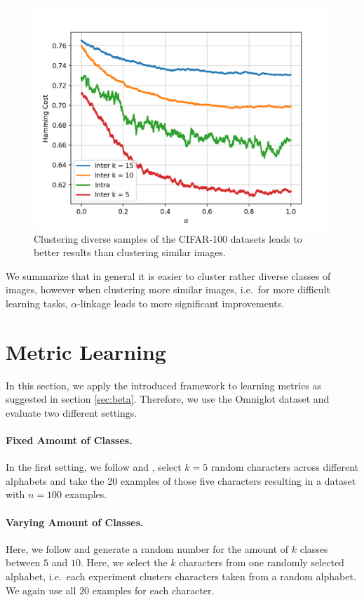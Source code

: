 \begin{figure}[H]
  \centering
  \includegraphics[width=.6\textwidth]{plots/cifar100}
  \caption{Clustering diverse samples of the CIFAR-100 datasets leads to better results than clustering similar images.}
  \label{fig:cifar100}
\end{figure}

We summarize that in general it is easier to cluster rather diverse classes of images, however when clustering more similar images, i.e.\ for more difficult learning tasks, $\alpha$-linkage leads to more significant improvements.

\section{Metric Learning}
\label{sec:metric}

In this section, we apply the introduced framework to learning metrics as suggested in section \ref{sec:beta}. Therefore, we use the Omniglot dataset and evaluate two different settings.

\paragraph{Fixed Amount of Classes.} In the first setting, we follow \cite{NIPS2016_6385} and \cite{pmlr-v70-finn17a}, select $k = 5$ random characters across different alphabets and take the 20 examples of those five characters resulting in a dataset with $n = 100$ examples.

\paragraph{Varying Amount of Classes.} Here, we follow \cite{DBLP:journals/corr/abs-1903-03096} and generate a random number for the amount of $k$ classes between $5$ and $10$. Here, we select the $k$ characters from one randomly selected alphabet, i.e.\ each experiment clusters characters taken from a random alphabet. We again use all $20$ examples for each character.

